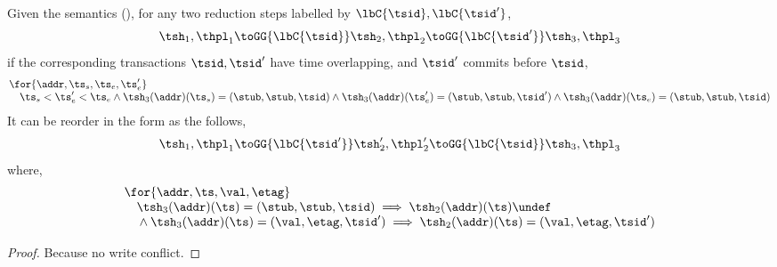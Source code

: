 \begin{lem}
\label{lem:reorder-concurrency}
Given the semantics (), for any two reduction steps labelled by \( \lbC{\tsid}, \lbC{\tsid'} \),
\[
    \tsh_{1}, \thpl_{1} \toGG{\lbC{\tsid}} \tsh_{2}, \thpl_{2} \toGG{\lbC{\tsid'}} \tsh_{3}, \thpl_{3}
\]
if the corresponding transactions \( \tsid, \tsid' \) have time overlapping, and \( \tsid' \) commits before \( \tsid \), 
\[
\begin{array}{@{}l@{}}
    \for{\addr, \ts_{s}, \ts_{e}, \ts_{e}'} \\
    \quad \ts_{s} < \ts_{e}' < \ts_{e}
    \land \tsh_{3}(\addr)(\ts_{s}) = (\stub, \stub, \tsid)
    \land \tsh_{3}(\addr)(\ts_{e}') = (\stub, \stub, \tsid')
    \land \tsh_{3}(\addr)(\ts_{e}) = (\stub, \stub, \tsid)
\end{array}
\]
It can be reorder in the form as the follows,
\[
\begin{array}{@{}l@{}}
    \tsh_{1}, \thpl_{1} \toGG{\lbC{\tsid'}} \tsh_{2}', \thpl_{2}' \toGG{\lbC{\tsid}} \tsh_{3}, \thpl_{3}
\end{array}
\]
where,
\[
\begin{array}{@{}l@{}}
    \for{\addr, \ts,\val,\etag} \\
    \quad \tsh_{3}(\addr)(\ts) = (\stub, \stub, \tsid) \implies \tsh_{2}(\addr)(\ts) \undef \\ 
    \quad {} \land \tsh_{3}(\addr)(\ts) = (\val, \etag, \tsid') \implies \tsh_{2}(\addr)(\ts) = (\val, \etag, \tsid')
\end{array}
\]
\end{lem}
\begin{proof}
Because no write conflict.
\end{proof}



